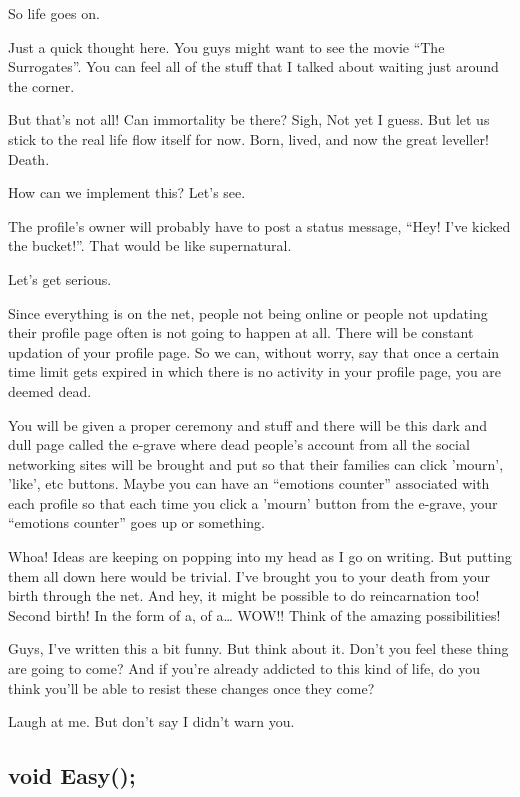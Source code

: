 \documentclass[twoside,11pt]{article}
\begin{document}
So life goes on.

Just a quick thought here. You guys might want to see the movie ``The Surrogates''. You can feel all of the stuff that I talked about waiting just around the corner.

But that's not all! Can immortality be there? Sigh, Not yet I guess. But let us stick to the real life flow itself for now. Born, lived, and now the great leveller! Death.

How can we implement this? Let's see.

The profile's owner will probably have to post a status message, ``Hey! I've kicked the bucket!''. That would be like supernatural.

Let's get serious.

Since everything is on the net, people not being online or people not updating their profile page often is not going to happen at all. There will be constant updation of your profile page. So we can, without worry, say that once a certain time limit gets expired in which there is no activity in your profile page, you are deemed dead.

You will be given a proper ceremony and stuff and there will be this dark and dull page called the e-grave where dead people's account from all the social networking sites will be brought and put so that their families can click 'mourn', 'like', etc buttons. Maybe you can have  an ``emotions counter'' associated with each profile so that each time you click a 'mourn' button from the e-grave, your ``emotions counter'' goes up or something.

Whoa! Ideas are keeping on popping into my head as I go on writing. But putting them all down here would be trivial. I've brought you to your death from your birth through the net. And hey, it might be possible to do reincarnation too! Second birth! In the form of a, of a… WOW!! Think of the amazing possibilities!

Guys, I've written this a bit funny. But think about it. Don't you feel these thing are going to come? And if you're already addicted to this kind of life, do you think you'll be able to resist these changes once they come?

Laugh at me. But don't say I didn't warn you.

\newpage
\begin{center}
  \section{void Easy();}
\end{center}
\bigskip
\bigskip
\bigskip
\end{document}
